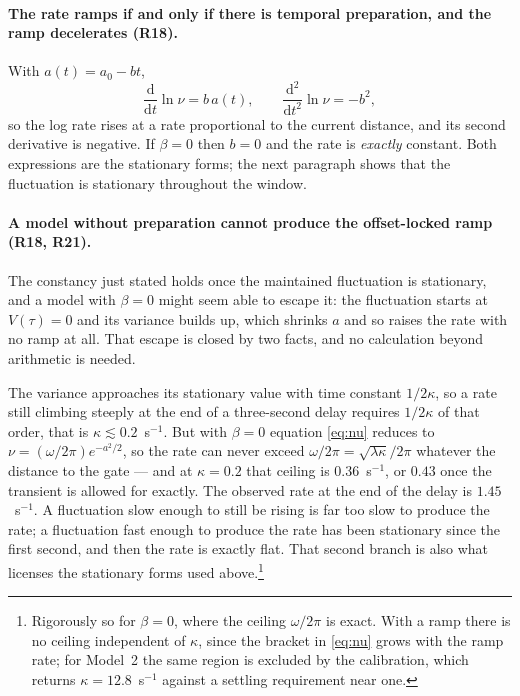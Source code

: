 \documentclass[a4paper,11pt]{article}
\newcommand{\dd}{\mathrm d}
\newcommand{\1}{\mathbbm{1}}
\begin{document}
\paragraph{The rate ramps if and only if there is temporal preparation, and the ramp
decelerates (R18).} With $a(t)=a_0-bt$,
\begin{equation}
\frac{\dd}{\dd t}\ln\nu=b\,a(t),
\qquad
\frac{\dd^{2}}{\dd t^{2}}\ln\nu=-b^{2},
\label{eq:slope}
\end{equation}
so the log rate rises at a rate proportional to the current distance, and its second
derivative is negative. If $\beta=0$ then $b=0$ and the rate is
\emph{exactly} constant. Both expressions are the stationary forms; the next paragraph
shows that the fluctuation is stationary throughout the window.

\paragraph{A model without preparation cannot produce the offset-locked ramp (R18, R21).}
The constancy just stated holds once the maintained fluctuation is stationary, and a
model with $\beta=0$ might seem able to escape it: the fluctuation starts at $V(\tau)=0$
and its variance builds up, which shrinks $a$ and so raises the rate with no ramp at all.
That escape is closed by two facts, and no calculation beyond arithmetic is needed.

The variance approaches its stationary value with time constant $1/2\kappa$, so a rate
still climbing steeply at the end of a three-second delay requires $1/2\kappa$ of that
order, that is $\kappa\lesssim0.2$~s$^{-1}$. But with $\beta=0$ equation \eqref{eq:nu}
reduces to $\nu=(\omega/2\pi)e^{-a^{2}/2}$, so the rate can never exceed
$\omega/2\pi=\sqrt{\lambda\kappa}/2\pi$ whatever the distance to the gate --- and at
$\kappa=0.2$ that ceiling is $0.36$~s$^{-1}$, or $0.43$ once the transient is allowed for
exactly. The observed rate at the end of the delay is $1.45$~s$^{-1}$. A fluctuation slow
enough to still be rising is far too slow to produce the rate; a fluctuation fast enough
to produce the rate has been stationary since the first second, and then the rate is
exactly flat. That second branch is also what licenses the stationary forms used
above.\footnote{Rigorously so for $\beta=0$, where the ceiling $\omega/2\pi$ is exact.
With a ramp there is no ceiling independent of $\kappa$, since the bracket in
\eqref{eq:nu} grows with the ramp rate; for Model~2 the same region is excluded by the
calibration, which returns $\kappa=12.8$~s$^{-1}$ against a settling requirement near
one.}
\end{document}
